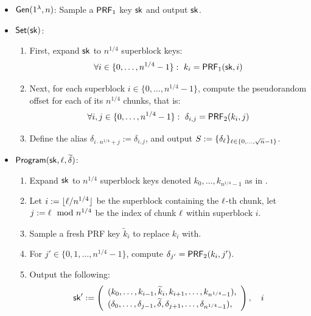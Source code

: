 \begin{itemize}[leftmargin=5mm,itemsep=1pt]
\item 
 ${\sf Gen}(1^\lambda, n)$: Sample a $\mathsf{PRF}_1$ key $\mathsf{sk}$ and output $\mathsf{sk}$.
\item 
${\sf Set}(\mathsf{sk})$:
\begin{enumerate}[leftmargin=5mm,itemsep=1pt]
\item 
First, expand $\mathsf{sk}$ to $n^{1/4}$ superblock keys:
\begin{equation}
\forall i \in \{0, \ldots, n^{1/4}-1\}: \ k_i = \mathsf{PRF}_1(\mathsf{sk}, i)
\label{eqn:expandsb}
\end{equation}
\item 
Next, for each superblock $i \in \{0, \ldots, n^{1/4}-1\}$, compute
the pseudorandom offset 
for each of its $n^{1/4}$ chunks, that is:
\begin{equation}
\forall i, j  \in \{0, \ldots, n^{1/4}-1\}: \ 
\delta_{i, j} = \PRF_2(k_i, j)
\label{eqn:expandchunk}
\end{equation}
\item 
Define the alias $\delta_{i \cdot n^{1/4} + j} := \delta_{i, j}$, 
and output 
$S := \{\delta_\ell\}_{\ell \in \{0, \ldots, \sqrt{n}-1\}}$.
\end{enumerate}
\item 
 ${\sf Program}(\mathsf{sk}, \ell, \widetilde{\delta})$:
\begin{enumerate}[leftmargin=5mm,itemsep=1pt]
\item 
Expand $\mathsf{sk}$ to $n^{1/4}$
superblock keys denoted $k_0, \ldots, k_{n^{1/4} -1}$ as in
.
\item 
Let $i := \lfloor\ell/n^{1/4}\rfloor$ 
be the superblock containing the $\ell$-th chunk,
let $j := \ell \mod n^{1/4}$ be the index of chunk $\ell$ within 
superblock $i$. 
\item 
Sample a fresh PRF key $\widetilde{k}_i$ to replace $k_i$ with. 
\item  
For $j' \in \{0, 1, \ldots, n^{1/4} -1\}$, compute 
$\delta_{j'} = \mathsf{PRF}_2(k_i, j')$.

\item 
Output the following:
\[
\mathsf{sk}' := 
\left(
\begin{array}{ll}
(k_0, \ldots, k_{i-1}, \widetilde{k}_i, k_{i+1}, \ldots, k_{n^{1/4}-1}),\\[1pt]
(\delta_0, \ldots, \delta_{j-1}, \widetilde{\delta}, \delta_{j+1}, 
\ldots, \delta_{n^{1/4}-1}),\\[1pt]
\end{array}
\right), \quad i 
\]
\end{enumerate}


\end{itemize}
